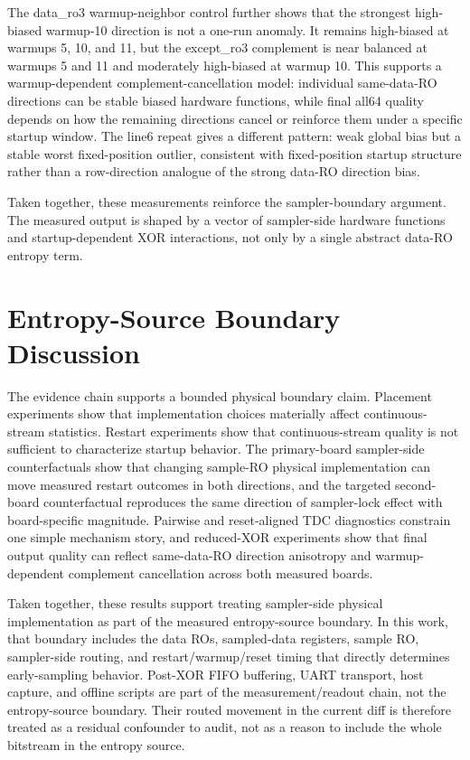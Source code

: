 \documentclass[journal]{IEEEtran}
\newcommand{\tdc}{TDC}
\begin{document}
The data\_ro3 warmup-neighbor control further shows that the strongest high-biased warmup-10 direction is not a one-run anomaly. It remains high-biased at warmups 5, 10, and 11, but the except\_ro3 complement is near balanced at warmups 5 and 11 and moderately high-biased at warmup 10. This supports a warmup-dependent complement-cancellation model: individual same-data-RO directions can be stable biased hardware functions, while final all64 quality depends on how the remaining directions cancel or reinforce them under a specific startup window. The line6 repeat gives a different pattern: weak global bias but a stable worst fixed-position outlier, consistent with fixed-position startup structure rather than a row-direction analogue of the strong data-RO direction bias.

Taken together, these measurements reinforce the sampler-boundary argument. The measured output is shaped by a vector of sampler-side hardware functions and startup-dependent XOR interactions, not only by a single abstract data-RO entropy term.

\section{Entropy-Source Boundary Discussion}

The evidence chain supports a bounded physical boundary claim. Placement experiments show that implementation choices materially affect continuous-stream statistics. Restart experiments show that continuous-stream quality is not sufficient to characterize startup behavior. The primary-board sampler-side counterfactuals show that changing sample-RO physical implementation can move measured restart outcomes in both directions, and the targeted second-board counterfactual reproduces the same direction of sampler-lock effect with board-specific magnitude. Pairwise and reset-aligned \tdc{} diagnostics constrain one simple mechanism story, and reduced-XOR experiments show that final output quality can reflect same-data-RO direction anisotropy and warmup-dependent complement cancellation across both measured boards.

Taken together, these results support treating sampler-side physical implementation as part of the measured entropy-source boundary. In this work, that boundary includes the data ROs, sampled-data registers, sample RO, sampler-side routing, and restart/warmup/reset timing that directly determines early-sampling behavior. Post-XOR FIFO buffering, UART transport, host capture, and offline scripts are part of the measurement/readout chain, not the entropy-source boundary. Their routed movement in the current diff is therefore treated as a residual confounder to audit, not as a reason to include the whole bitstream in the entropy source.
\end{document}
